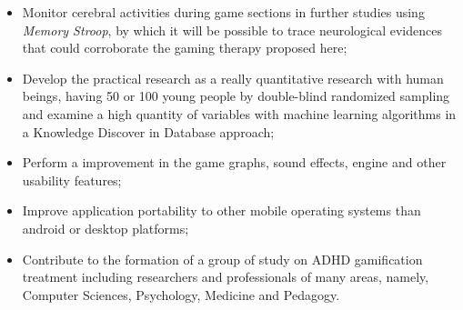 \begin{itemize}
	\item Monitor cerebral activities during game sections in further studies using \textit{Memory Stroop}, by which it will be possible to trace neurological evidences that could corroborate the gaming therapy proposed here;
	\item Develop the practical research as a really quantitative research with human beings, having 50 or 100 young people by double-blind randomized sampling and examine a high quantity of variables with machine learning algorithms in a Knowledge Discover in Database approach;
	\item Perform a improvement in the game graphs, sound effects, engine and other usability features;
	\item Improve application portability to other mobile operating systems than android or desktop platforms;
	\item Contribute to the formation of a group of study on ADHD gamification treatment including researchers and professionals of many areas, namely, Computer Sciences, Psychology, Medicine and Pedagogy.
	
	
\end{itemize}